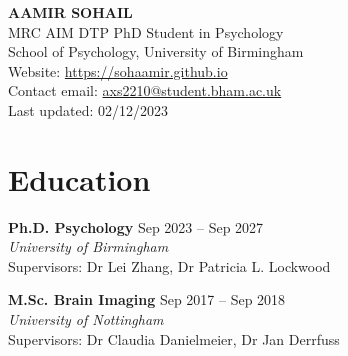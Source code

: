 \documentclass[a4paper,10pt]{article}
\begin{document}
\begin{center}
    \textbf{\Huge \scshape AAMIR SOHAIL} \\ \vspace{8pt}
    MRC AIM DTP PhD Student in Psychology \\ \vspace{1pt}
    School of Psychology, University of Birmingham \\ \vspace{1pt}
    Website: \href{https://sohaamir.github.io}{\color{linkcolor}https://sohaamir.github.io} \\ \vspace{1pt}
    Contact email: \href{mailto:axs2210@bham.ac.uk}{\color{linkcolor}axs2210@student.bham.ac.uk} \\
    Last updated: 02/12/2023
\end{center}

\section{Education}
\vspace{2.5pt}
\begin{adjustwidth}{0em}{0pt}
\textbf{Ph.D. Psychology} \hfill {Sep 2023 -- Sep 2027} \\
\emph{University of Birmingham} \\
Supervisors: Dr Lei Zhang, Dr Patricia L. Lockwood
\end{adjustwidth}

\vspace{8pt} %

\begin{adjustwidth}{0em}{0pt}
\textbf{M.Sc. Brain Imaging} \hfill{Sep 2017 -- Sep 2018} \\
\emph{University of Nottingham} \\
Supervisors: Dr Claudia Danielmeier, Dr Jan Derrfuss
\end{adjustwidth}
\end{document}
